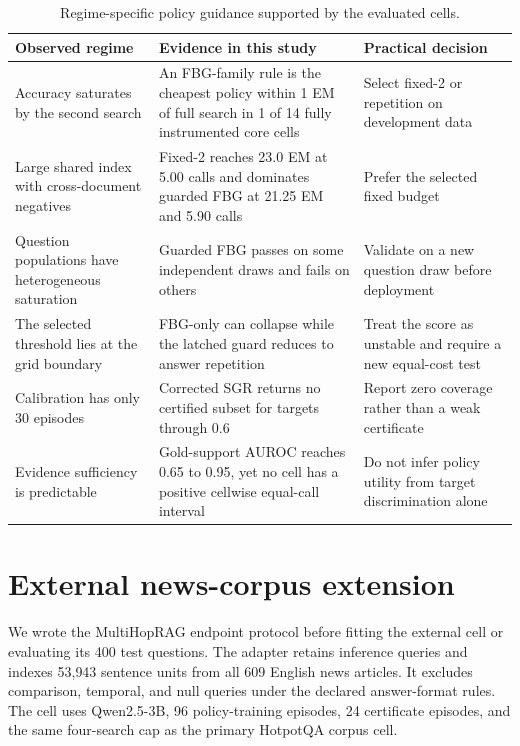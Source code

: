 \documentclass[manuscript,nonacm]{acmart}
\begin{document}
\begin{table}[H]
\caption{Regime-specific policy guidance supported by the evaluated cells.}
\label{tab:supp-decision}
\footnotesize
\setlength{\tabcolsep}{4pt}
\begin{tabular}{p{}p{}p{}}
\toprule
Observed regime & Evidence in this study & Practical decision \\
\midrule
Accuracy saturates by the second search & An FBG-family rule is the cheapest
policy within 1 EM of full search in 1 of 14 fully instrumented core cells &
Select fixed-2 or repetition on development data \\
Large shared index with cross-document negatives & Fixed-2 reaches 23.0 EM at
5.00 calls and dominates guarded FBG at 21.25 EM and 5.90 calls & Prefer the
selected fixed budget \\
Question populations have heterogeneous saturation & Guarded FBG passes on
some independent draws and fails on others & Validate on a new question draw
before deployment \\
The selected threshold lies at the grid boundary & FBG-only can collapse while
the latched guard reduces to answer repetition & Treat the score as unstable
and require a new equal-cost test \\
Calibration has only 30 episodes & Corrected SGR returns no certified subset
for targets through 0.6 & Report zero coverage rather than a weak certificate \\
Evidence sufficiency is predictable & Gold-support AUROC reaches 0.65 to 0.95,
yet no cell has a positive cellwise equal-call interval & Do not infer policy
utility from target discrimination alone \\
\bottomrule
\end{tabular}
\end{table}

\section{External news-corpus extension}
\label{supp:external}

We wrote the MultiHopRAG endpoint protocol before fitting the external cell or
evaluating its 400 test questions. The adapter retains inference queries and
indexes 53{,}943 sentence units from all 609 English news articles. It excludes
comparison, temporal, and null queries under the declared answer-format rules.
The cell uses Qwen2.5-3B, 96 policy-training episodes, 24 certificate episodes,
and the same four-search cap as the primary HotpotQA corpus cell.
\end{document}
